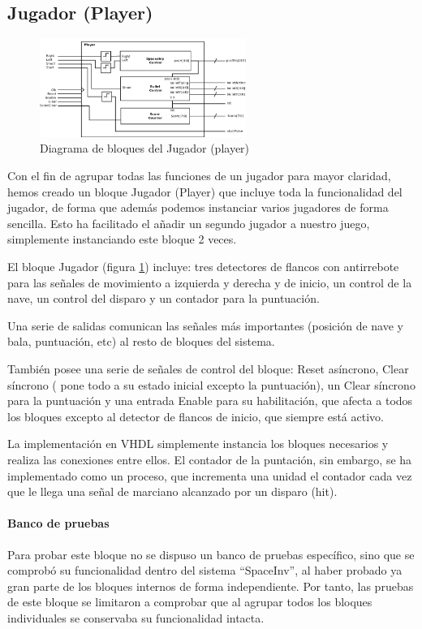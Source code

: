 \subsection{Jugador (Player)}
\label{player}

\begin{figure}[H]
	\centering
	\includegraphics[width=0.6\textwidth]{player_block.png}
	\caption{Diagrama de bloques del Jugador (player) }\label{fig:playerBlock}
\end{figure}

Con el fin de agrupar todas las funciones de un jugador para mayor claridad, hemos creado un bloque Jugador (Player) que incluye toda la funcionalidad del jugador, de forma que además podemos instanciar varios jugadores de forma sencilla. Esto ha facilitado el añadir un segundo jugador a nuestro juego, simplemente instanciando este bloque 2 veces.

El bloque Jugador (figura \ref{fig:playerBlock}) incluye: tres detectores de flancos con antirrebote para las señales de movimiento a izquierda y derecha y de inicio, un control de la nave, un control del disparo y un contador para la puntuación.

Una serie de salidas comunican las señales más importantes (posición de nave y bala, puntuación, etc) al resto de bloques del sistema.

También posee una serie de señales de control del bloque: Reset asíncrono, Clear síncrono ( pone todo a su estado inicial excepto la puntuación), un Clear síncrono para la puntuación y una entrada Enable para su habilitación, que afecta a todos los bloques excepto al detector de flancos de inicio, que siempre está activo.

La implementación en VHDL simplemente instancia los bloques necesarios y realiza las conexiones entre ellos. El contador de la puntación, sin embargo, se ha implementado como un proceso, que incrementa una unidad el contador cada vez que le llega una señal de marciano alcanzado por un disparo (hit).

\paragraph{Banco de pruebas}
Para probar este bloque no se dispuso un banco de pruebas específico, sino que se comprobó su funcionalidad dentro del sistema ``SpaceInv'', al haber probado ya gran parte de los bloques internos de forma independiente. Por tanto, las pruebas de este bloque se limitaron a comprobar que al agrupar todos los bloques individuales se conservaba su funcionalidad intacta.
